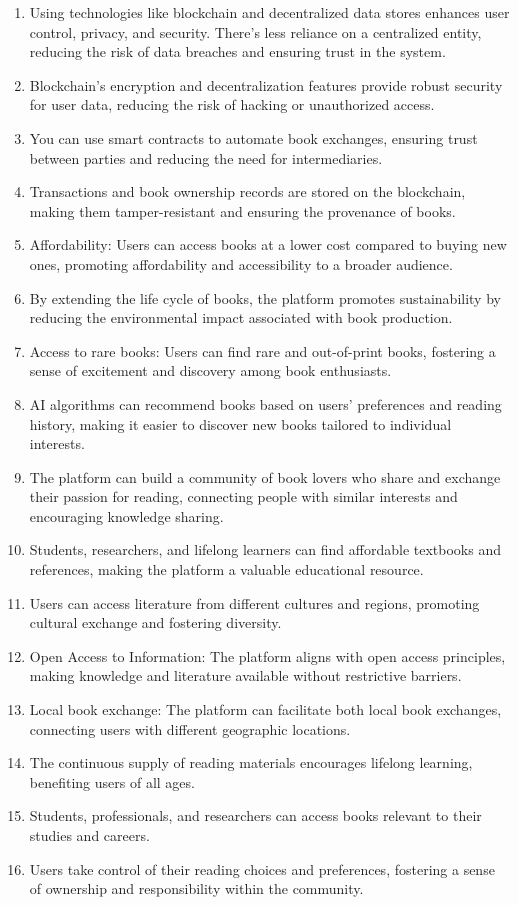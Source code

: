 

\begin{enumerate}
 \item Using technologies like blockchain and decentralized data stores enhances user control, privacy, and security. There's less reliance on a centralized entity, reducing the risk of data breaches and ensuring trust in the system.
  \item Blockchain's encryption and decentralization features provide robust security for user data, reducing the risk of hacking or unauthorized access.
  \item You can use smart contracts to automate book exchanges, ensuring trust between parties and reducing the need for intermediaries.
  \item Transactions and book ownership records are stored on the blockchain, making them tamper-resistant and ensuring the provenance of books.
  \item Affordability: Users can access books at a lower cost compared to buying new ones, promoting affordability and accessibility to a broader audience.
  \item By extending the life cycle of books, the platform promotes sustainability by reducing the environmental impact associated with book production.
  \item Access to rare books: Users can find rare and out-of-print books, fostering a sense of excitement and discovery among book enthusiasts.
  \item AI algorithms can recommend books based on users' preferences and reading history, making it easier to discover new books tailored to individual interests.
  \item The platform can build a community of book lovers who share and exchange their passion for reading, connecting people with similar interests and encouraging knowledge sharing.
  \item Students, researchers, and lifelong learners can find affordable textbooks and references, making the platform a valuable educational resource.
  \item Users can access literature from different cultures and regions, promoting cultural exchange and fostering diversity.
  \item Open Access to Information: The platform aligns with open access principles, making knowledge and literature available without restrictive barriers.
  \item Local book exchange: The platform can facilitate both local book exchanges, connecting users with different geographic locations.
  \item The continuous supply of reading materials encourages lifelong learning, benefiting users of all ages.
  \item Students, professionals, and researchers can access books relevant to their studies and careers.
  \item Users take control of their reading choices and preferences, fostering a sense of ownership and responsibility within the community.
\end{enumerate}
